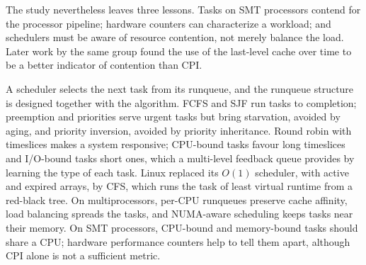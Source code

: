 \documentclass[../main.tex]{subfiles}
\begin{document}
\begin{note}
  The study nevertheless leaves three lessons.  Tasks on SMT processors
  contend for the processor pipeline; hardware counters can characterize a
  workload; and schedulers must be aware of resource contention, not merely
  balance the load.  Later work by the same group \cite{fedorova2005} found the
  use of the last-level cache over time to be a better indicator of
  contention than CPI.
\end{note}

\begin{keypoint}
  A scheduler selects the next task from its runqueue, and the runqueue
  structure is designed together with the algorithm.  FCFS and SJF run
  tasks to completion; preemption and priorities serve urgent tasks but
  bring starvation, avoided by aging, and priority inversion, avoided by
  priority inheritance.  Round robin with timeslices makes a system
  responsive; CPU-bound tasks favour long timeslices and I/O-bound tasks
  short ones, which a multi-level feedback queue provides by learning the
  type of each task.  Linux replaced its $O(1)$ scheduler, with active and
  expired arrays, by CFS, which runs the task of least virtual runtime from a
  red-black tree.  On multiprocessors, per-CPU runqueues preserve cache
  affinity, load balancing spreads the tasks, and NUMA-aware scheduling keeps
  tasks near their memory.  On SMT processors, CPU-bound and memory-bound
  tasks should share a CPU; hardware performance counters help to tell them
  apart, although CPI alone is not a sufficient metric.
\end{keypoint}
\end{document}
